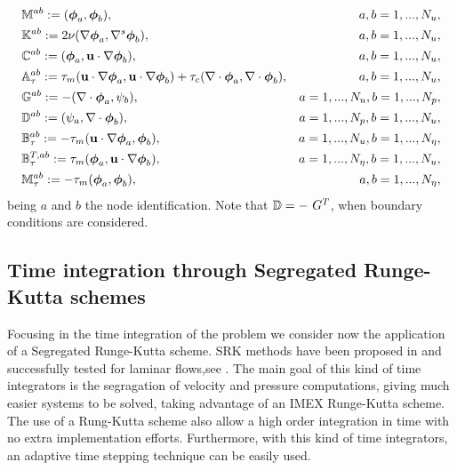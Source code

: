 \begin{align*}
&\mathbb{M}^{ab}:=(\boldsymbol{\phi}_{a},\boldsymbol{\phi}_{b}),&a,b=1,...,N_u,\\
&\mathbb{K}^{ab}:=2\nu(\nabla\boldsymbol{\phi}_{a},\nabla^s\boldsymbol{\phi}_{b}),&a,b=1,...,N_u,\\
&\mathbb{C}^{ab}:=(\boldsymbol{\phi}_{a},{\bf u}\cdot\nabla\boldsymbol{\phi}_{b}),&a,b=1,...,N_u,\\
&\mathbb{A}_{\tau}^{ab}:=\tau_m({\bf u}\cdot\nabla\boldsymbol{\phi}_{a},{\bf u}\cdot\nabla\boldsymbol{\phi}_{b})+\tau_c(\nabla\cdot\boldsymbol{\phi}_{a},\nabla\cdot\boldsymbol{\phi}_{b}),&a,b=1,...,N_u,\\
&\mathbb{G}^{ab}:=-(\nabla\cdot\boldsymbol{\phi}_{a},\psi_{b}),&a=1,...,N_u,b=1,...,N_p,\\
&\mathbb{D}^{ab}:=(\psi_{a},\nabla\cdot\boldsymbol{\phi}_{b}),&a=1,...,N_p,b=1,...,N_u,\\
&\mathbb{B}_{\tau}^{ab}:=-\tau_m({\bf u}\cdot\nabla\boldsymbol{\phi}_{a},\boldsymbol{\phi}_{b}),&a=1,...,N_u,b=1,...,N_\eta,\\
&\mathbb{B}_{\tau}^{T,ab}:=\tau_m(\boldsymbol{\phi}_{a},{\bf u}\cdot\nabla\boldsymbol{\phi}_{b}),&a=1,...,N_\eta,b=1,...,N_u,\\
&\mathbb{M}_{\tau}^{ab}:=-\tau_m(\boldsymbol{\phi}_{a},\boldsymbol{\phi}_{b}),&a,b=1,...,N_\eta,
\end{align*}
being $a$ and $b$ the node identification. Note that $\D=-\	G^T$, when boundary conditions are considered.

\subsection{Time integration through Segregated Runge-Kutta schemes}
\label{subsec:C7_SRK}
Focusing in the time integration of the problem  we consider now the application of a Segregated Runge-Kutta scheme. SRK methods have been proposed in \cite{colomes_segregated_2015} and successfully tested for laminar flows,see . The main goal of this kind of time integrators is the segragation of velocity and pressure computations, giving much easier systems to be solved, taking advantage of an IMEX Runge-Kutta scheme. The use of a Rung-Kutta scheme also allow a high order integration in time with no extra implementation efforts. Furthermore, with this kind of time integrators, an adaptive time stepping technique can be easily used.

